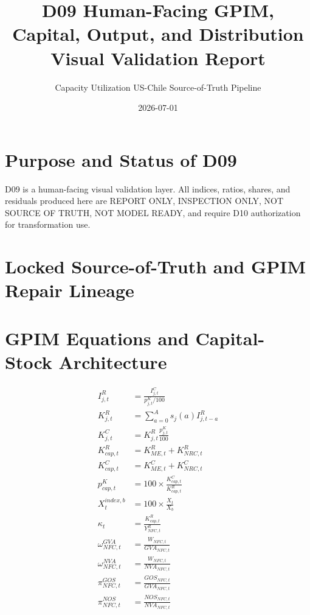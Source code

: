 \documentclass[11pt]{article}
\title{D09 Human-Facing GPIM, Capital, Output, and Distribution Visual Validation Report}
\author{Capacity Utilization US-Chile Source-of-Truth Pipeline}
\date{2026-07-01}
\begin{document}
\maketitle\tableofcontents\clearpage
\section{Purpose and Status of D09}
D09 is a human-facing visual validation layer. All indices, ratios, shares, and residuals produced here are REPORT ONLY, INSPECTION ONLY, NOT SOURCE OF TRUTH, NOT MODEL READY, and require D10 authorization for transformation use.
\section{Locked Source-of-Truth and GPIM Repair Lineage}

\section{GPIM Equations and Capital-Stock Architecture}

\begin{align} I^{R}_{j,t} &= \frac{I^{C}_{j,t}}{p^{K}_{j,t}/100}\\ K^{R}_{j,t} &= \sum_{a=0}^{A} s_j(a) I^{R}_{j,t-a}\\ K^{C}_{j,t} &= K^{R}_{j,t}\frac{p^{K}_{j,t}}{100}\\ K^{R}_{cap,t} &= K^{R}_{ME,t} + K^{R}_{NRC,t}\\ K^{C}_{cap,t} &= K^{C}_{ME,t} + K^{C}_{NRC,t}\\ p^{K}_{cap,t} &= 100\times \frac{K^{C}_{cap,t}}{K^{R}_{cap,t}}\\ X^{index,b}_{t} &= 100\times \frac{X_t}{X_b}\\ \kappa_t &= \frac{K^{R}_{cap,t}}{Y^{R}_{NFC,t}}\\ \omega^{GVA}_{NFC,t} &= \frac{W_{NFC,t}}{GVA_{NFC,t}}\\ \omega^{NVA}_{NFC,t} &= \frac{W_{NFC,t}}{NVA_{NFC,t}}\\ \pi^{GOS}_{NFC,t} &= \frac{GOS_{NFC,t}}{GVA_{NFC,t}}\\ \pi^{NOS}_{NFC,t} &= \frac{NOS_{NFC,t}}{NVA_{NFC,t}} \end{align}
\end{document}
